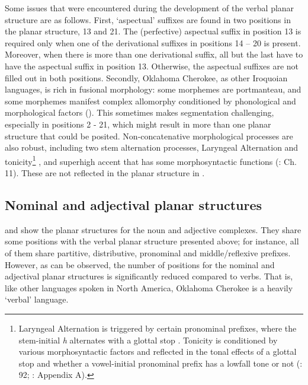 \documentclass[output=paper]{langscibook}
\begin{document}
Some issues that were encountered during the development of the verbal planar structure are as follows. First, `aspectual' suffixes are found in two positions in the planar structure, 13 and 21. The (perfective) aspectual suffix in position 13 is required only when one of the derivational suffixes in positions 14 – 20 is present. Moreover, when there is more than one derivational suffix, all but the last have to have the aspectual suffix in position 13. Otherwise, the aspectual suffixes are not filled out in both positions. Secondly, Oklahoma Cherokee, as other Iroquoian languages, is rich in fusional morphology: some morphemes are portmanteau, and some morphemes manifest complex allomorphy conditioned by phonological and morphological factors (\citealt{BarrieUchihara2019}). This sometimes makes segmentation challenging, especially in positions 2 - 21,  which might result in more than one planar structure that could be posited. Non-concatenative morphological processes are also robust, including two stem alternation processes, Laryngeal Alternation and tonicity\footnote{Laryngeal Alternation is triggered by certain pronominal prefixes, where the stem-initial \textit{h} alternates with a glottal stop \citep{Munrolaryngeal}. Tonicity is conditioned by various morphosyntactic factors and reflected in the tonal effects of a glottal stop and whether a vowel-initial pronominal prefix has a lowfall tone or not (\citealt{Cook1979}: 92; \citealt{uchihara2016tone}: Appendix A).} , and superhigh accent that has some morphosyntactic functions (\citealt{uchihara2016tone}: Ch. 11). These are not reflected in the planar structure in .


\subsection{Nominal and adjectival planar structures}

 and  show the planar structures for the noun and adjective complexes. They share some positions with the verbal planar structure presented above; for instance, all of them share partitive, distributive, pronominal and middle/reflexive prefixes. However, as can be observed, the number of positions for the nominal and adjectival planar structures is significantly reduced compared to verbs. That is, like other languages spoken in North America, Oklahoma Cherokee is a heavily `verbal' language.
\end{document}
